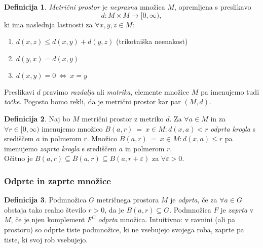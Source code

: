\documentclass[11pt]{article}
\theoremstyle{definition}
\newtheorem{definicija}{Definicija}[section]
\theoremstyle{definition}
\theoremstyle{definition}
\begin{document}
\begin{definicija}

\textit{Metrični prostor} je \textit{neprazna} množica $M$, opremljena s preslikavo
$$d: M \times M \rightarrow [0, \infty),$$
ki ima naslednja lastnosti za $\forall x, y, z \in M$:
\begin{enumerate}
	\item $d(x, z) \leq d(x, y) + d(y, z)$ (trikotniška neenakost)
	\item $d(y, x) = d(x, y)$
	\item $d(x, y) = 0 ~\Leftrightarrow~ x = y$
\end{enumerate}
Preslikavi $d$ pravimo \textit{razdalja} ali \textit{matrika}, elemente množice $M$ pa imenujemo tudi \textit{točke}. Pogosto bomo rekli, da je metrični prostor kar par $(M, d)$.

\end{definicija}
\vspace{0.5cm}

\begin{definicija}

Naj bo $M$ metrični prostor z metriko $d$. Za $\forall a \in M$ in za $\forall r \in [0, \infty)$ imenujemo množico 
$B(a, r) ~=~ {x \in M: d(x, a) < r}$
\textit{odprta krogla} s središčem $a$ in polmerom $r$. Množico 
$\overline{B}(a, r) ~=~ {x \in M: d(x, a) \leq r}$
pa imenujemo \textit{zaprta krogla} s središčem $a$ in polmerom $r$. \\

\noindent Očitno je $B(a, r) \subseteq \overline{B}(a, r) \subseteq B(a, r + \varepsilon)$ za $\forall \varepsilon > 0$.

\end{definicija}
\vspace{0.5cm}


\subsubsection{Odprte in zaprte množice}
\vspace{0.5cm}

\begin{definicija}

Podmnožica $G$ metričnega prostora $M$ je \textit{odprta}, če za $\forall a \in G$ obstaja tako realno število $r > 0$, da je $B(a, r) \subseteq G$. Podmnožica $F$ je \textit{zaprta} v $M$, če je njen komplement $F^C$ \textit{odprta} množica. Intuitivno: v ravnini (ali pa prostoru) so odprte tiste podmnožice, ki ne vsebujejo svojega roba, zaprte pa tiste, ki svoj rob vsebujejo.

\end{definicija}
\vspace{0.5cm}
\end{document}
